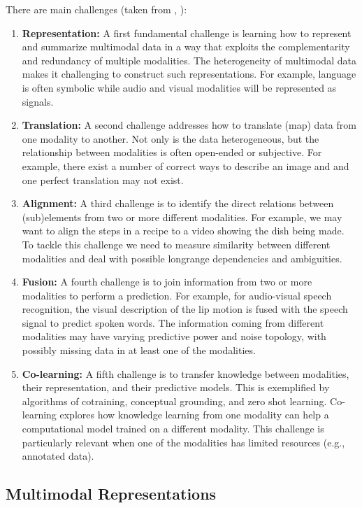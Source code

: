There are main challenges (taken from \cite{Baltruvsaitis2017multimodal}, ):
\begin{enumerate}
\item \textbf{Representation:} A first fundamental challenge is learning how to represent and summarize multimodal data in a way that exploits the complementarity and redundancy of multiple modalities. The heterogeneity of multimodal data makes it challenging to construct such representations. For example, language is often symbolic while audio and visual modalities will be represented as signals.
\item \textbf{Translation:} A second challenge addresses how to translate (map) data from one modality to another. Not only is the data heterogeneous, but the relationship between modalities is often open-ended or subjective. For example, there exist a number of correct ways to describe an image and and one perfect translation may not exist.
\item \textbf{Alignment:} A third challenge is to identify the direct relations between (sub)elements from two or more different modalities. For example, we may want to align the steps in a recipe to a video showing the dish being made. To tackle this challenge we need to measure similarity between different modalities and deal with possible longrange dependencies and ambiguities.
\item \textbf{Fusion:} A fourth challenge is to join information from two or more modalities to perform a prediction. For example, for audio-visual speech recognition, the visual description of the lip motion is fused with the speech signal to predict spoken words. The information coming
from different modalities may have varying predictive power and noise topology, with possibly missing data in at least one of the modalities.
\item \textbf{Co-learning:} A fifth challenge is to transfer knowledge between modalities, their representation, and their predictive models. This is exemplified by algorithms of cotraining,
conceptual grounding, and zero shot learning.
Co-learning explores how knowledge learning from one modality can help a computational model trained on a different modality. This challenge is particularly relevant when one of the modalities has limited resources (e.g., annotated data).
\end{enumerate}

\subsection{Multimodal Representations}

